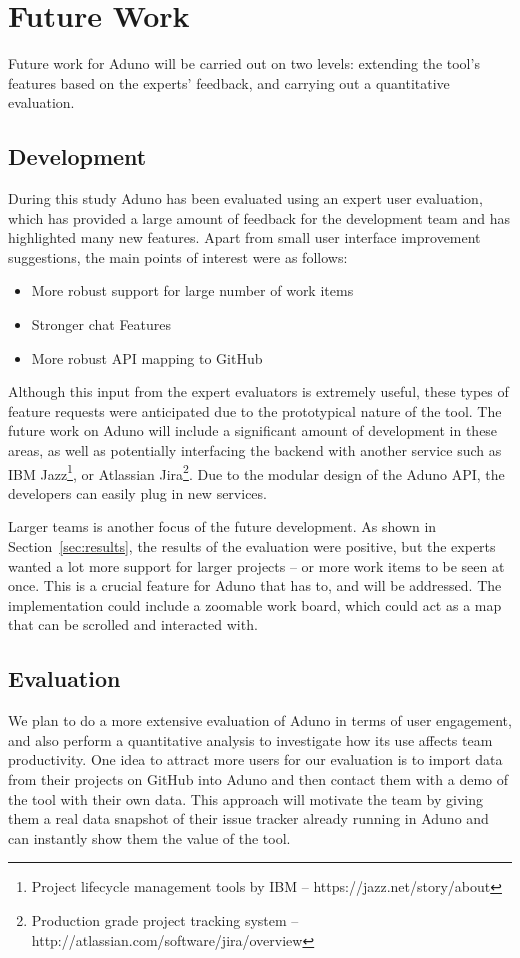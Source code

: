 \documentclass[conference]{IEEEtran}
\begin{document}
\section{Future Work}
\label{sec:future}

Future work for Aduno will be carried out on two levels: extending the tool's features based on the experts' feedback, and carrying out a quantitative evaluation. 
\subsection{Development}
During this study Aduno has been evaluated using an expert user evaluation, which has provided a large amount of feedback for the development team and has highlighted many new features.  Apart from small user interface improvement suggestions, the main points of interest were as follows:

\begin{itemize}
    \item{More robust support for large number of work items}
    \item{Stronger chat Features} 
    \item{More robust API mapping to GitHub}
\end{itemize}

Although this input from the expert evaluators is extremely useful, these types of feature requests were anticipated due to the prototypical nature of the tool.  The future work on Aduno will include a significant amount of development in these areas, as well as potentially interfacing the backend with another service such as IBM Jazz\footnote{Project lifecycle management tools by IBM -- https://jazz.net/story/about}, or Atlassian Jira\footnote{Production grade project tracking system -- http://atlassian.com/software/jira/overview}. Due to the modular design of the Aduno API, the developers can easily plug in new services.  

Larger teams is another focus of the future development.  As shown in Section~\ref{sec:results}, the results of the evaluation were positive, but the experts wanted a lot more support for larger projects -- or more work items to be seen at once.  This is a crucial feature for Aduno that has to, and will be addressed.  The implementation could include a zoomable work board, which could act as a map that can be scrolled and interacted with.  

\subsection{Evaluation}
We plan to do a more extensive evaluation of Aduno in terms of user engagement, and also perform a quantitative analysis to investigate how its use affects team productivity. One idea to attract more users for our evaluation is to import data from their projects on GitHub into Aduno and then contact them with a demo of the tool with their own data. This approach will motivate the team by giving them a real data snapshot of their issue tracker already running in Aduno and can instantly show them the value of the tool.  
\end{document}
